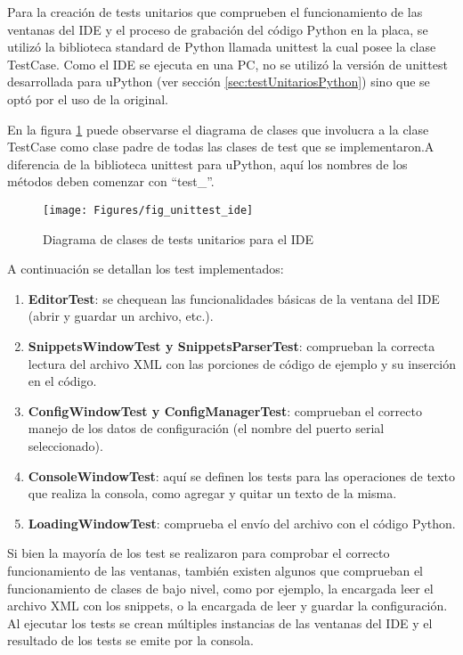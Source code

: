 Para la creación de tests unitarios que comprueben el funcionamiento de las ventanas del IDE y el proceso de grabación del código Python en la placa, se utilizó la biblioteca standard de Python llamada unittest la cual posee la clase TestCase. Como el IDE se ejecuta en una PC, no se utilizó la versión de unittest desarrollada para uPython (ver sección \ref{sec:testUnitariosPython}) sino que se optó por el uso de la original.

En la figura \ref{fig:unittestide} puede observarse el diagrama de clases que involucra a la clase TestCase como clase padre de todas las clases de test que se implementaron.A diferencia de la biblioteca unittest para uPython, aquí los nombres de los métodos deben comenzar con “test\_”.

\begin{figure}[h]
  \centering
    \texttt{[image: Figures/fig\_unittest\_ide]}
  \caption{Diagrama de clases de tests unitarios para el IDE}
  \label{fig:unittestide}
\end{figure}

A continuación se detallan los test implementados:

\begin{enumerate}
	\item  \textbf{EditorTest}: se chequean las funcionalidades básicas de la ventana del IDE (abrir y guardar un archivo, etc.).
	\item  \textbf{SnippetsWindowTest y SnippetsParserTest}: comprueban la correcta lectura del archivo XML con las porciones de código de ejemplo y su inserción en el código.
	\item  \textbf{ConfigWindowTest y ConfigManagerTest}: comprueban el correcto manejo de los datos de configuración (el nombre del puerto serial seleccionado).
	\item  \textbf{ConsoleWindowTest}: aquí se definen los tests para las operaciones de texto que realiza la consola, como agregar y quitar un texto de la misma.
	\item  \textbf{LoadingWindowTest}: comprueba el envío del archivo con el código Python.
\end{enumerate}

Si bien la mayoría de los test se realizaron para comprobar el correcto funcionamiento de las ventanas, también existen algunos que comprueban el funcionamiento de clases de bajo nivel, como por ejemplo, la encargada leer el archivo XML con los snippets, o la encargada de leer y guardar la configuración. Al ejecutar los tests se crean múltiples instancias de las ventanas del IDE y el resultado de los tests se emite por la consola.



